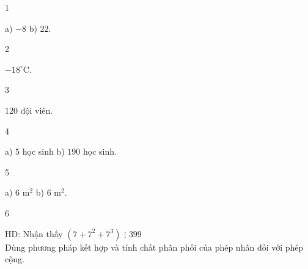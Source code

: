 \begin{Solbook}{1}
 \par \noindent a) $-8$ \hfill b) $22$.  \hfill \qedEX 
\end{Solbook}
\begin{Solbook}{2}
 \par \noindent $-18^\circ $C. \hfill \qedEX 
\end{Solbook}
\begin{Solbook}{3}
 \par \noindent $120$ đội viên. \hfill \qedEX 
\end{Solbook}
\begin{Solbook}{4}
 \par \noindent a) $5$ học sinh \hfill b) $190$ học sinh.  \hfill \qedEX 
\end{Solbook}
\begin{Solbook}{5}
 \par \noindent a) $6$ m$^2$ \hfill b) $6$ m$^2$. \hfill \qedEX 
\end{Solbook}
\begin{Solbook}{6}
 \par \noindent HD: Nhận thấy $(7+7^{2}+7^{3})$ $\vdots $ $399$\\ Dùng phương pháp kết hợp và tính chất phân phối của phép nhân đối với phép cộng. \hfill \qedEX 
\end{Solbook}
